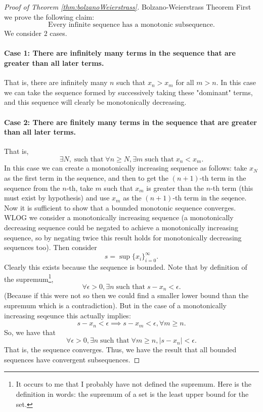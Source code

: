\documentclass{article}[11pt]
\DeclareMathOperator{\st}{\text{ such that }}
\begin{document}
\begin{proof}[Proof of Theorem \ref{thm:bolzanoWeierstrass}]{Bolzano-Weierstrass Theorem}
	First we prove the following claim: $$\text{Every infinite sequence has a monotonic subsequence}.$$
	We consider $2$ cases. 
	\paragraph{Case 1: There are infinitely many terms in the sequence that are greater than all later terms.} That is, there are infinitely many $n$ such that $x_n > x_m$ for all $m> n$. In this case we can take the sequence formed by successively taking these "dominant" terms, and this sequence will clearly be monotonically decreasing.
	\paragraph{Case 2: There are finitely many terms in the sequence that are greater than all later terms.} That is, $$\exists N, \st \forall n \ge N, \exists m \st x_n < x_m.$$ 
	In this case we can create a monotonically increasing sequence as follows: take $x_N$ as the first term in the sequence, and then to get the $(n+1)$-th term in the sequence from the $n$-th, take $m$ such that $x_m$ is greater than the $n$-th term (this must exist by hypothesis) and use $x_m$ as the $(n+1)$-th term in the seqence.\\
	Now it is sufficient to show that a bounded monotonic sequence converges. \\
	WLOG we consider a monotonically increasing sequence (a monotonically decreasing sequence could be negated to achieve a monotonically increasing sequence, so by negating twice this result holds for monotonically decreasing sequences too). Then consider $$s = \sup{\{x_i\}_{i=0}^\infty}.$$ 
	Clearly this exists because the sequence is bounded.
Note that by definition of the supremum\footnote{It occurs to me that I probably have not defined the supremum. Here is the definition in words: the supremum of a set is the least upper bound for the set.}, 
	$$\forall \epsilon > 0, \exists n \st s-x_n < \epsilon.$$
	(Because if this were not so then we could find a smaller lower bound than the supremum which is a contradiction).
	But in the case of a monotonically increasing seqeunce this actually implies:
	$$s-x_n < \epsilon \implies s-x_m < \epsilon, \forall m \ge n.$$
	So, we have that 
	$$\forall \epsilon > 0, \exists n \st \forall m \ge n, |s-x_n| < \epsilon.$$
	That is, the sequence converges.
	Thus, we have the result that all bounded sequences have convergent subsequences.
\end{proof}
\end{document}

